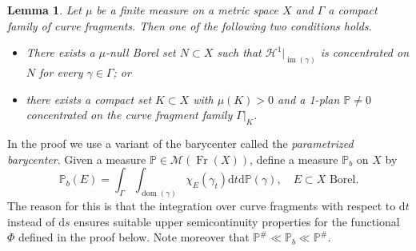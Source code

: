 \documentclass{amsart}
\newtheorem{lemma}[theorem]{Lemma}
\numberwithin{equation}{section}
\renewcommand{\P}{\mathbb{P}}
\newcommand{\Ha}{\mathcal{H}}
\newcommand{\im}{\operatorname{im}}
\newcommand{\dom}{\operatorname{dom}}
\newcommand{\Fr}{\operatorname{Fr}}
\newcommand{\ud}{\mathrm {d}}
\begin{document}
\begin{lemma}\label{lem:rainwater}
    Let $\mu$ be a finite measure on a metric space $X$ and $\Gamma$ a compact family of curve fragments. Then one of the following two conditions holds.
    \begin{itemize}
        \item[(1)] There exists a $\mu$-null Borel set $N\subset X$ such that $\Ha^1|_{\im(\gamma)}$ is concentrated on $N$ for every $\gamma\in\Gamma$; or
        \item[(2)] there exists a compact set $K\subset X$ with $\mu(K)>0$ and a 1-plan $\mathbb P\ne 0$ concentrated on the curve fragment family $\Gamma|_K$.
    \end{itemize}
\end{lemma}
In the proof we use a variant of the barycenter called the \emph{parametrized barycenter}. Given a measure $\P\in \mathcal M(\Fr(X))$, define a measure $\P_b$ on $X$ by 
\[
\P_b(E)=\int_\Gamma\int_{\dom(\gamma)}\chi_E(\gamma_t)\ud t\ud\P(\gamma),\quad E\subset X\textrm{ Borel}.
\]
The reason for this is that the integration over curve fragments with respect to $\ud t$ instead of $\ud s$ ensures suitable upper semicontinuity properties for the functional $\Phi$ defined in the proof below. Note moreover that $\P^\#\ll\P_b\ll\P^\#$.
\end{document}
